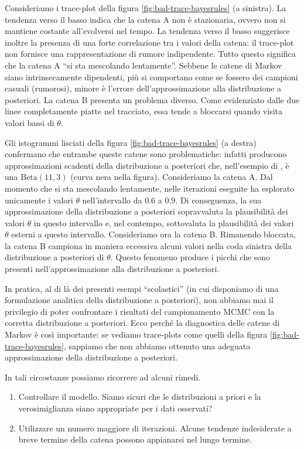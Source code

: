 \documentclass[
  11pt,
  italian,
  a4paper,
  extrafontsizes,onecolumn,openright
  ]{memoir}
\begin{document}
Consideriamo i trace-plot della figura \ref{fig:bad-trace-bayesrules} (a sinistra). La tendenza verso il basso indica che la catena A non è stazionaria, ovvero non si mantiene costante all'evolversi nel tempo. La tendenza verso il basso suggerisce inoltre la presenza di una forte correlazione tra i valori della catena: il trace-plot non fornisce una rappresentazione di rumore indipendente. Tutto questo significa che la catena A ``si sta mescolando lentamente''. Sebbene le catene di Markov siano intrinsecamente dipendenti, più si comportano come se fossero dei campioni casuali (rumorosi), minore è l'errore dell'approssimazione alla distribuzione a posteriori. La catena B presenta un problema diverso. Come evidenziato dalle due linee completamente piatte nel tracciato, essa tende a bloccarsi quando visita valori bassi di \(\theta\).

Gli istogrammi lisciati della figura \ref{fig:bad-trace-bayesrules} (a destra) confermano che entrambe queste catene sono problematiche: infatti producono approssimazioni scadenti della distribuzione a posteriori che, nell'esempio di \textcite{Johnson2022bayesrules}, è una \(\mbox{Beta}(11, 3)\) (curva nera nella figura). Consideriamo la catena A. Dal momento che si sta mescolando lentamente, nelle iterazioni eseguite ha esplorato unicamente i valori \(\theta\) nell'intervallo da 0.6 a 0.9. Di conseguenza, la sua approssimazione della distribuzione a posteriori sopravvaluta la plausibilità dei valori \(\theta\) in questo intervallo e, nel contempo, sottovaluta la plausibilità dei valori \(\theta\) esterni a questo intervallo. Consideriamo ora la catena B. Rimanendo bloccata, la catena B campiona in maniera eccessiva alcuni valori nella coda sinistra della distribuzione a posteriori di \(\theta\). Questo fenomeno produce i picchi che sono presenti nell'approssimazione alla distribuzione a posteriori.

In pratica, al di là dei presenti esempi ``scolastici'' (in cui disponiamo di una formulazione analitica della distribuzione a posteriori), non abbiamo mai il privilegio di poter confrontare i risultati del campionamento MCMC con la corretta distribuzione a posteriori. Ecco perché la diagnostica delle catene di Markov è così importante: se vediamo trace-plots come quelli della figura \ref{fig:bad-trace-bayesrules}, sappiamo che non abbiamo ottenuto una adeguata approssimazione della distribuzione a posteriori.

In tali circostanze possiamo ricorrere ad alcuni rimedi.

\begin{enumerate}
\def\labelenumi{\arabic{enumi}.}
\item
  Controllare il modello. Siamo sicuri che le distribuzioni a priori e la verosimiglianza siano appropriate per i dati osservati?
\item
  Utilizzare un numero maggiore di iterazioni. Alcune tendenze indesiderate a breve termine della catena possono appianarsi nel lungo termine.
\end{enumerate}
\end{document}
